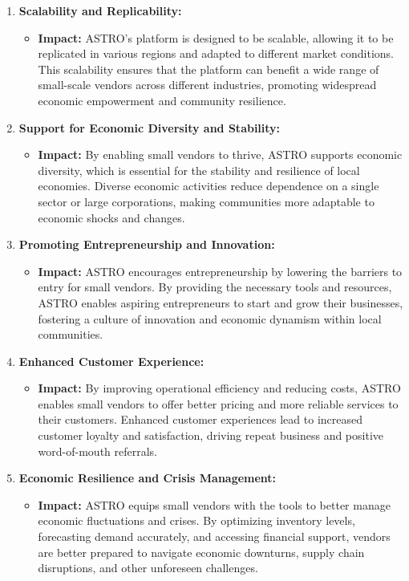 \begin{enumerate}
		\item \textbf{Scalability and Replicability:}
		\begin{itemize}
			\item \textbf{Impact:} ASTRO’s platform is designed to be scalable, allowing it to be replicated in various regions and adapted to different market conditions. This scalability ensures that the platform can benefit a wide range of small-scale vendors across different industries, promoting widespread economic empowerment and community resilience.
		\end{itemize}
		
		\item \textbf{Support for Economic Diversity and Stability:}
		\begin{itemize}
			\item \textbf{Impact:} By enabling small vendors to thrive, ASTRO supports economic diversity, which is essential for the stability and resilience of local economies. Diverse economic activities reduce dependence on a single sector or large corporations, making communities more adaptable to economic shocks and changes.
		\end{itemize}
		
		\item \textbf{Promoting Entrepreneurship and Innovation:}
		\begin{itemize}
			\item \textbf{Impact:} ASTRO encourages entrepreneurship by lowering the barriers to entry for small vendors. By providing the necessary tools and resources, ASTRO enables aspiring entrepreneurs to start and grow their businesses, fostering a culture of innovation and economic dynamism within local communities.
		\end{itemize}
		
		\item \textbf{Enhanced Customer Experience:}
		\begin{itemize}
			\item \textbf{Impact:} By improving operational efficiency and reducing costs, ASTRO enables small vendors to offer better pricing and more reliable services to their customers. Enhanced customer experiences lead to increased customer loyalty and satisfaction, driving repeat business and positive word-of-mouth referrals.
		\end{itemize}
		
		\item \textbf{Economic Resilience and Crisis Management:}
		\begin{itemize}
			\item \textbf{Impact:} ASTRO equips small vendors with the tools to better manage economic fluctuations and crises. By optimizing inventory levels, forecasting demand accurately, and accessing financial support, vendors are better prepared to navigate economic downturns, supply chain disruptions, and other unforeseen challenges.
		\end{itemize}
		

\end{enumerate}
